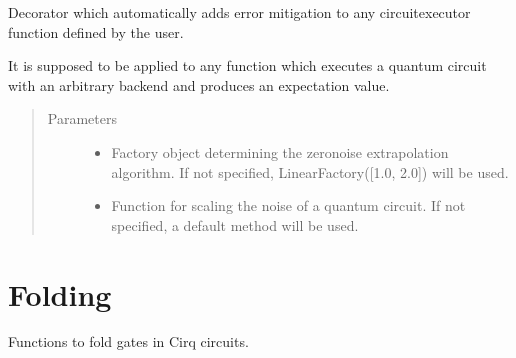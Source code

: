 \documentclass[letterpaper,10pt,english]{sphinxmanual}
\begin{document}
\begin{fulllineitems}
\label{\detokenize{apidoc:mitiq.zne.zne_decorator}}
Decorator which automatically adds error mitigation to any circuit\sphinxhyphen{}executor function
defined by the user.

It is supposed to be applied to any function which executes a quantum circuit
with an arbitrary backend and produces an expectation value.
\begin{quote}\begin{description}
\item[{Parameters}] \leavevmode\begin{itemize}
\item {} 
 \sphinxhyphen{}\sphinxhyphen{} Factory object determining the zero\sphinxhyphen{}noise extrapolation algorithm.
If not specified, LinearFactory({[}1.0, 2.0{]}) will be used.

\item {} 
 \sphinxhyphen{}\sphinxhyphen{} Function for scaling the noise of a quantum circuit.
If not specified, a default method will be used.

\end{itemize}

\end{description}\end{quote}

\end{fulllineitems}



\section{Folding}
\label{\detokenize{apidoc:module-mitiq.folding_cirq}}\label{\detokenize{apidoc:folding}}
Functions to fold gates in Cirq circuits.
\end{document}
